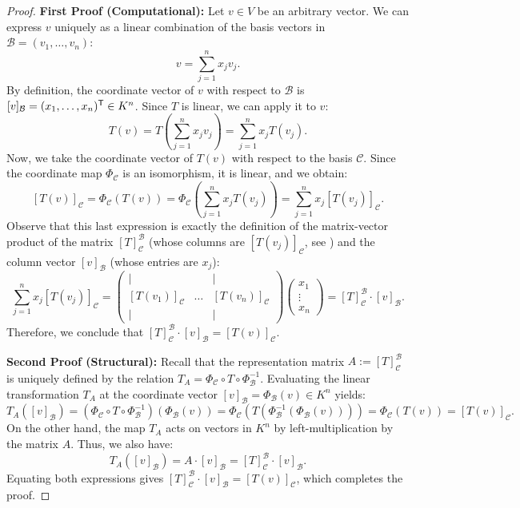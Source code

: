 \begin{proof}
\textbf{First Proof (Computational):} Let $v \in V$ be an arbitrary vector. We can express $v$ uniquely as a linear combination of the basis vectors in $\mathcal{B} = (v_1, \dots, v_n)$:
\[
v = \sum_{j=1}^n x_j v_j.
\]
By definition, the coordinate vector of $v$ with respect to $\mathcal{B}$ is $[v]_{\mathcal{B}} = (x_1, \dots, x_n)^{\mathsf{T}} \in K^n$. Since $T$ is linear, we can apply it to $v$:
\[
T(v) = T\left( \sum_{j=1}^n x_j v_j \right) = \sum_{j=1}^n x_j T(v_j).
\]
Now, we take the coordinate vector of $T(v)$ with respect to the basis $\mathcal{C}$. Since the coordinate map $\Phi_{\mathcal{C}}$ is an isomorphism, it is linear, and we obtain:
\[
[T(v)]_{\mathcal{C}} = \Phi_{\mathcal{C}}(T(v)) = \Phi_{\mathcal{C}}\left( \sum_{j=1}^n x_j T(v_j) \right) = \sum_{j=1}^n x_j [T(v_j)]_{\mathcal{C}}.
\]
Observe that this last expression is exactly the definition of the matrix-vector product of the matrix $[T]_{\mathcal{C}}^{\mathcal{B}}$ (whose columns are $[T(v_j)]_{\mathcal{C}}$, see ) and the column vector $[v]_{\mathcal{B}}$ (whose entries are $x_j$):
\[
\sum_{j=1}^n x_j [T(v_j)]_{\mathcal{C}} = 
\begin{pmatrix}
| & & | \\
[T(v_1)]_{\mathcal{C}} & \dots & [T(v_n)]_{\mathcal{C}} \\
| & & |
\end{pmatrix}
\begin{pmatrix}
x_1 \\ \vdots \\ x_n
\end{pmatrix}
= [T]_{\mathcal{C}}^{\mathcal{B}} \cdot [v]_{\mathcal{B}}.
\]
Therefore, we conclude that $[T]_{\mathcal{C}}^{\mathcal{B}} \cdot [v]_{\mathcal{B}} = [T(v)]_{\mathcal{C}}$.

\textbf{Second Proof (Structural):} Recall that the representation matrix $A := [T]_{\mathcal{C}}^{\mathcal{B}}$ is uniquely defined by the relation $T_A = \Phi_{\mathcal{C}} \circ T \circ \Phi_{\mathcal{B}}^{-1}$. Evaluating the linear transformation $T_A$ at the coordinate vector $[v]_{\mathcal{B}} = \Phi_{\mathcal{B}}(v) \in K^n$ yields:
\[
T_A([v]_{\mathcal{B}}) = \left(\Phi_{\mathcal{C}} \circ T \circ \Phi_{\mathcal{B}}^{-1}\right) (\Phi_{\mathcal{B}}(v)) = \Phi_{\mathcal{C}}\left(T\left(\Phi_{\mathcal{B}}^{-1}(\Phi_{\mathcal{B}}(v))\right)\right) = \Phi_{\mathcal{C}}(T(v)) = [T(v)]_{\mathcal{C}}.
\]
On the other hand, the map $T_A$ acts on vectors in $K^n$ by left-multiplication by the matrix $A$. Thus, we also have:
\[
T_A([v]_{\mathcal{B}}) = A \cdot [v]_{\mathcal{B}} = [T]_{\mathcal{C}}^{\mathcal{B}} \cdot [v]_{\mathcal{B}}.
\]
Equating both expressions gives $[T]_{\mathcal{C}}^{\mathcal{B}} \cdot [v]_{\mathcal{B}} = [T(v)]_{\mathcal{C}}$, which completes the proof.
\end{proof}

